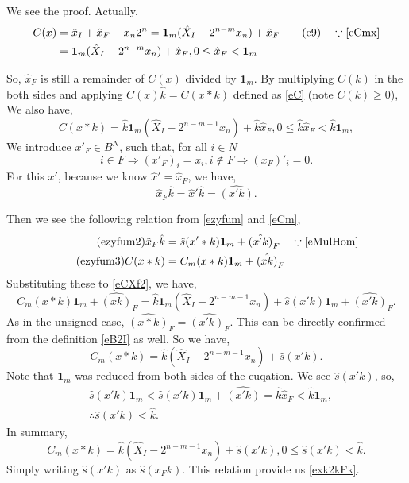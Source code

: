 \documentclass[a4paper]{article}
\newcommand{\eqlabel}[1]{\label{#1}\tag{#1}}
\newcommand{\br}[1]{\left(#1\right)}
\newcommand{\hx}{{\hat{x}}}
\newcommand{\hk}{{\hat{k}}}
\newcommand{\hs}{{\hat{s}}}
\newcommand{\hX}{{\hat{X}}}
\newcommand{\fum}{{\mathbf{1}_m}}
\begin{document}
We see the proof. Actually, 
\begin{align}
    \nonumber
C(x) &= \hx_I + \hx_F - x_n 2^n = \fum (\hX_I - 2^{n-m}x_n) + \hx_F
\eqlabel{e9}\quad \because \eqref{eCmx}\\
&= \fum (\hX_I - 2^{n-m}x_n) + \hx_F, 0\leq \hx_F < \fum 
\end{align}

So, \(\hx_F\) is still a remainder of \(C(x)\) divided by \(\fum\). By multiplying \(C(k)\) in the both sides and applying \(C(x)\hk = C(x*k)\) defined as \eqref{eC} (note \(C(k) \geq 0\)), We also have, 
\begin{equation}
    \eqlabel{eCXf2}
C(x*k) = \hk\fum (\hX_I - 2^{n-m-1}x_n) + \hk\hx_F, 0\leq \hk\hx_F < \hk\fum,
\end{equation}
We introduce \(x'_F\in B^N\), such that, for all \(i\in N\)
\[
	i\in F \Rightarrow (x'_F)_i = x_i, i\not\in F \Rightarrow (x_F)'_i = 0.
\]
For this \(x'\), because we know \(\hx' = \hx_F\), we have,
\[
	\hx_F \hk = \hx' \hk = \hat{(x' k)}.
\]

Then we see the following relation from \eqref{ezyfum} and \eqref{eCm}, 
\begin{align}
    \eqlabel{ezyfum2}
\hx_F \hk  &=  \hs(x' * k)\fum + \hat{(x' k)}_F\quad\because \eqref{eMulHom}\\
    \eqlabel{ezyfum3}
C(x*k) &=  C_m(x*k) \fum + \hat{(x k)}_F
\end{align}
Substituting these to \eqref{eCXf2}, we have,
\[
 C_m(x*k)\fum + \hat{(x k)}_F = \hk\fum (\hX_I - 2^{n-m-1}x_n) + \hs(x' k)\fum + \hat{(x' k)}_F.
\]
As in the unsigned case, \(\hat{(x*k)}_F = \hat{(x' k)_F}\). This can be directly confirmed from the definition \eqref{eB2I} as well. So we have,
\[ 
  C_m(x*k) = \hk (\hX_I - 2^{n-m-1}x_n) + \hs(x' k).
\]
Note that \(\fum\) was reduced from both sides of the euqation. We see \(\hs(x' k)\), so,
\begin{align*}
& \hs(x' k)\fum < \hs(x' k)\fum + \hat{(x' k)} = \hk\hx_F < \hk \fum,\\
&\therefore \hs(x' k) < \hk.
\end{align*}
In summary, 
\[
  C_m(x*k) = \hk (\hX_I - 2^{n-m-1}x_n) + \hs(x' k), 0\leq \hs(x' k) < \hk.
\]
Simply writing \(\hs\br{x' k}\) as \(\hs\br{x_F k}\). This relation provide us \eqref{exk2kFk}.
\end{document}
